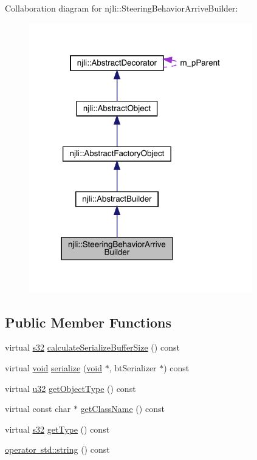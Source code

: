 Collaboration diagram for njli\+:\+:Steering\+Behavior\+Arrive\+Builder\+:\nopagebreak
\begin{figure}[H]
\begin{center}
\leavevmode
\includegraphics[width=275pt]{classnjli_1_1_steering_behavior_arrive_builder__coll__graph}
\end{center}
\end{figure}
\subsection*{Public Member Functions}
\begin{DoxyCompactItemize}
\item 
virtual \mbox{\hyperlink{_util_8h_aa62c75d314a0d1f37f79c4b73b2292e2}{s32}} \mbox{\hyperlink{classnjli_1_1_steering_behavior_arrive_builder_ac3a1c5c02af8295b4da5043b61929070}{calculate\+Serialize\+Buffer\+Size}} () const
\item 
virtual \mbox{\hyperlink{_thread_8h_af1e856da2e658414cb2456cb6f7ebc66}{void}} \mbox{\hyperlink{classnjli_1_1_steering_behavior_arrive_builder_ab2db80fafdc9da01f1869d1cbfabef7f}{serialize}} (\mbox{\hyperlink{_thread_8h_af1e856da2e658414cb2456cb6f7ebc66}{void}} $\ast$, bt\+Serializer $\ast$) const
\item 
virtual \mbox{\hyperlink{_util_8h_a10e94b422ef0c20dcdec20d31a1f5049}{u32}} \mbox{\hyperlink{classnjli_1_1_steering_behavior_arrive_builder_aeab31c2042c67a36fffcdff213e0d52a}{get\+Object\+Type}} () const
\item 
virtual const char $\ast$ \mbox{\hyperlink{classnjli_1_1_steering_behavior_arrive_builder_a4030f557718317373ffcb0a594a0b8d5}{get\+Class\+Name}} () const
\item 
virtual \mbox{\hyperlink{_util_8h_aa62c75d314a0d1f37f79c4b73b2292e2}{s32}} \mbox{\hyperlink{classnjli_1_1_steering_behavior_arrive_builder_a21c8502230046aec05026a8fc761cc67}{get\+Type}} () const
\item 
\mbox{\hyperlink{classnjli_1_1_steering_behavior_arrive_builder_a385fb23caec31f074aa21bf99a17b206}{operator std\+::string}} () const
\end{DoxyCompactItemize}
